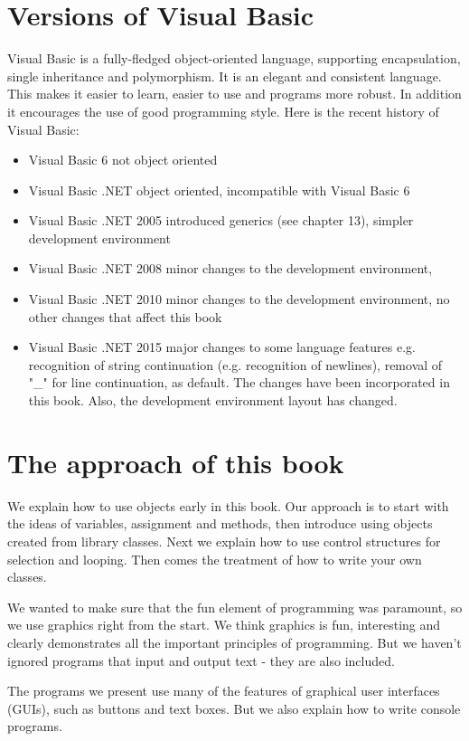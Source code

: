 	\section*{Versions of Visual Basic}
		Visual Basic is a fully-fledged object-oriented language, supporting encapsulation, single inheritance and polymorphism. It is an elegant and consistent language. This makes it easier to learn, easier to use and programs more robust. In addition it encourages the use of good programming style.
Here is the recent history of Visual Basic:
		\begin{itemize}
			\item	Visual Basic 6 not object oriented
			\item	Visual Basic .NET	object oriented, incompatible with Visual Basic 6
			\item Visual Basic .NET 2005	introduced generics (see chapter 13), simpler development environment
			\item	Visual Basic .NET 2008	minor changes to the development environment, 
			\item	Visual Basic .NET 2010	minor changes to the development environment, no other changes that affect this book
			\item Visual Basic .NET 2015 	major changes to some language features e.g. recognition of string continuation (e.g. recognition of newlines), removal of "\_" for line continuation,  as default. The changes have been incorporated in this book. Also, the development environment layout has changed.
		\end{itemize}


	\section*{The approach of this book}
		We explain how to use objects early in this book. Our approach is to start with the ideas of variables, assignment and methods, then introduce using objects created from library classes. Next we explain how to use control structures for selection and looping. Then comes the treatment of how to write your own classes.

		We wanted to make sure that the fun element of programming was paramount, so we use graphics right from the start. We think graphics is fun, interesting and clearly demonstrates all the important principles of programming. But we haven't ignored programs that input and output text - they are also included.

		The programs we present use many of the features of graphical user interfaces (GUIs), such as buttons and text boxes. But we also explain how to write console programs.
	
